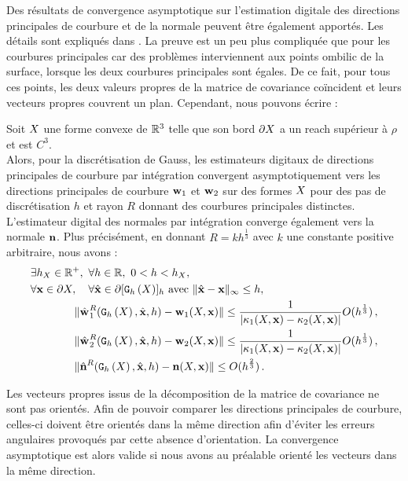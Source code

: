 Des résultats de convergence asymptotique sur l'estimation digitale des
directions principales de courbure et de la normale peuvent être également
apportés. Les détails sont expliqués dans \cite{ChapterIICurvature}. La preuve
est un peu plus compliquée que pour les courbures principales car des problèmes
interviennent aux points ombilic de la surface, \cad lorsque les deux courbures
principales sont égales. De ce fait, pour tous ces points, les deux valeurs
propres de la matrice de covariance coïncident et leurs vecteurs propres
couvrent un plan. Cependant, nous pouvons écrire :
%
\begin{theorem}{}
\label{thm:multigrid-conv-principal-directions-and-normal}
  Soit $X$ une forme convexe de $\mathbb{R}^3$ telle que son bord $\partial X$ a un
  reach supérieur à $\rho$ et est $C^3$.
  \\
  Alors, pour la discrétisation de Gauss, les estimateurs digitaux de directions
  principales de courbure par intégration convergent asymptotiquement vers les
  directions principales de courbure $\mathbf{w}_{1}$ et $\mathbf{w}_{2}$ sur des
  formes $X$ pour des pas de discrétisation $h$ et rayon $R$ donnant des
  courbures principales distinctes. L'estimateur digital des normales par
  intégration converge également vers la normale $\mathbf{n}$. Plus précisément,
  en donnant $R=k h^{\frac{1}{3}}$ avec $k$ une constante positive arbitraire,
  nous avons :
  \begin{align}
    &\exists h_{X} \in \mathbb{R}^+,\,\, \forall h \in \mathbb{R},\,\, 0 < h < h_{X},\,\,
     \,\,\nonumber\quad \quad\quad \quad\\
    &\forall \mathbf{x} \in \partial X, \quad \forall \hat{\mathbf{x}} \in \partial \lbrack \mathtt{G}_{h}\left(X\right) \rbrack_{h}  \text{~avec~} \| \hat{\mathbf{x}} -\mathbf{x}\|_\infty
    \le h, \nonumber\quad \quad\quad \quad \\
    &\quad \quad\quad \quad\| \hat{\mathbf{w}_{}}_{1}^{R}( \mathtt{G}_{h}\left(X\right), \hat{\mathbf{x}}, h ) - \mathbf{w}_{1}(X, \mathbf{x}) \|
    \le \frac{1}{|\kappa_{1}(X,\mathbf{x})-\kappa_{2}(X,\mathbf{x})|} O(h^{\frac{1}{3}})\,, \\
    &\quad \quad\quad \quad\| \hat{\mathbf{w}_{}}_{2}^{R}( \mathtt{G}_{h}\left(X\right), \hat{\mathbf{x}}, h ) - \mathbf{w}_{2}(X, \mathbf{x}) \|
    \le \frac{1}{|\kappa_{1}(X,\mathbf{x})-\kappa_{2}(X,\mathbf{x})|} O(h^{\frac{1}{3}})\,, \\
    &\quad \quad\quad \quad\| \hat{\mathbf{n}{}}^{R}( \mathtt{G}_{h}\left(X\right), \hat{\mathbf{x}}, h ) - \mathbf{n}(X, \mathbf{x}) \|
    \le O(h^{\frac{2}{3}})\,.
  \end{align}
\end{theorem}
%
Les vecteurs propres issus de la décomposition de la matrice de covariance ne
sont pas orientés. Afin de pouvoir comparer les directions principales de
courbure, celles-ci doivent être orientés dans la même direction afin d'éviter
les erreurs angulaires provoqués par cette absence d'orientation. La convergence
asymptotique est alors valide si nous avons au préalable orienté les vecteurs dans
la même direction.


